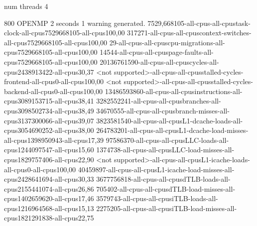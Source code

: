 num threads 4

800
OPENMP
2 seconds
1 warning generated.
7529,668105-all-cpus-all-cpustask-clock-all-cpus7529668105-all-cpus100,00
317271-all-cpus-all-cpuscontext-switches-all-cpus7529668105-all-cpus100,00
29-all-cpus-all-cpuscpu-migrations-all-cpus7529668105-all-cpus100,00
14544-all-cpus-all-cpuspage-faults-all-cpus7529668105-all-cpus100,00
20136761590-all-cpus-all-cpuscycles-all-cpus2438913422-all-cpus30,37
<not supported>-all-cpus-all-cpusstalled-cycles-frontend-all-cpus0-all-cpus100,00
<not supported>-all-cpus-all-cpusstalled-cycles-backend-all-cpus0-all-cpus100,00
13486593860-all-cpus-all-cpusinstructions-all-cpus3089153715-all-cpus38,41
3282552241-all-cpus-all-cpusbranches-all-cpus3098502734-all-cpus38,49
34670555-all-cpus-all-cpusbranch-misses-all-cpus3137300066-all-cpus39,07
3823581540-all-cpus-all-cpusL1-dcache-loads-all-cpus3054690252-all-cpus38,00
264783201-all-cpus-all-cpusL1-dcache-load-misses-all-cpus1398950943-all-cpus17,39
97586370-all-cpus-all-cpusLLC-loads-all-cpus1244097547-all-cpus15,60
1374738-all-cpus-all-cpusLLC-load-misses-all-cpus1829757406-all-cpus22,90
<not supported>-all-cpus-all-cpusL1-icache-loads-all-cpus0-all-cpus100,00
40459897-all-cpus-all-cpusL1-icache-load-misses-all-cpus2428641694-all-cpus30,33
3677756818-all-cpus-all-cpusdTLB-loads-all-cpus2155441074-all-cpus26,86
705402-all-cpus-all-cpusdTLB-load-misses-all-cpus1402659620-all-cpus17,46
3579743-all-cpus-all-cpusiTLB-loads-all-cpus1216964568-all-cpus15,13
2275205-all-cpus-all-cpusiTLB-load-misses-all-cpus1821291838-all-cpus22,75

